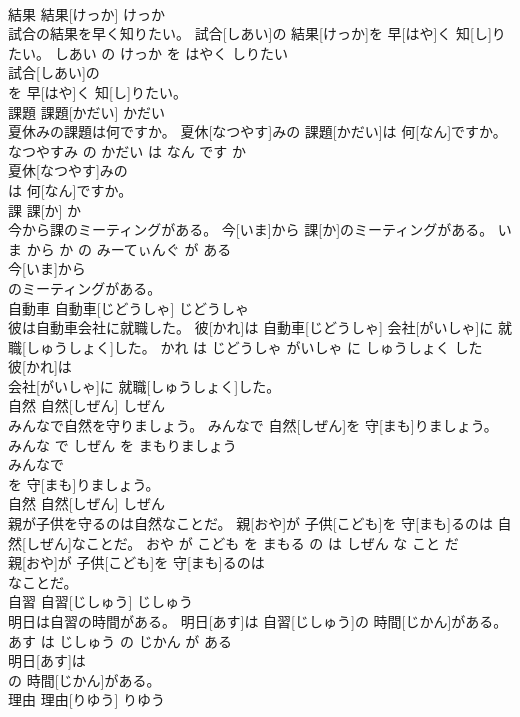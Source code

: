 \documentclass[8pt]{extreport}
\begin{document}
\begin{CJK}{UTF8}{min}
\\	結果	結果[けっか]	けっか	
\\	試合の結果を早く知りたい。	試合[しあい]の 結果[けっか]を 早[はや]く 知[し]りたい。	しあい の けっか を はやく しりたい	
\\	試合[しあい]の
\\	を 早[はや]く 知[し]りたい。			
\\	課題	課題[かだい]	かだい	
\\	夏休みの課題は何ですか。	夏休[なつやす]みの 課題[かだい]は 何[なん]ですか。	なつやすみ の かだい は なん です か	
\\	夏休[なつやす]みの
\\	は 何[なん]ですか。			
\\	課	課[か]	か	
\\	今から課のミーティングがある。	今[いま]から 課[か]のミーティングがある。	いま から か の みーてぃんぐ が ある	
\\	今[いま]から
\\	のミーティングがある。			
\\	自動車	自動車[じどうしゃ]	じどうしゃ	
\\	彼は自動車会社に就職した。	彼[かれ]は 自動車[じどうしゃ] 会社[がいしゃ]に 就職[しゅうしょく]した。	かれ は じどうしゃ がいしゃ に しゅうしょく した	
\\	彼[かれ]は
\\	会社[がいしゃ]に 就職[しゅうしょく]した。			
\\	自然	自然[しぜん]	しぜん	
\\	みんなで自然を守りましょう。	みんなで 自然[しぜん]を 守[まも]りましょう。	みんな で しぜん を まもりましょう	
\\	みんなで
\\	を 守[まも]りましょう。			
\\	自然	自然[しぜん]	しぜん	
\\	親が子供を守るのは自然なことだ。	親[おや]が 子供[こども]を 守[まも]るのは 自然[しぜん]なことだ。	おや が こども を まもる の は しぜん な こと だ	
\\	親[おや]が 子供[こども]を 守[まも]るのは
\\	なことだ。			
\\	自習	自習[じしゅう]	じしゅう	
\\	明日は自習の時間がある。	明日[あす]は 自習[じしゅう]の 時間[じかん]がある。	あす は じしゅう の じかん が ある	
\\	明日[あす]は
\\	の 時間[じかん]がある。			
\\	理由	理由[りゆう]	りゆう	

\end{CJK}
\end{document}
